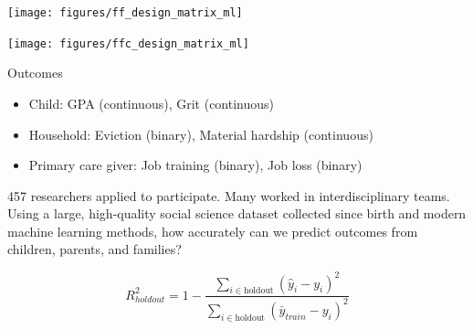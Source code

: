 \documentclass[aspectratio=169]{beamer}
\begin{document}
\begin{frame}

\begin{center}
\end{center}

\end{frame}
\begin{frame}

\begin{center}
\texttt{[image: figures/ff\_design\_matrix\_ml]}
\end{center}

\end{frame}
\begin{frame}

\begin{center}
\texttt{[image: figures/ffc\_design\_matrix\_ml]}
\end{center}

\end{frame}
\begin{frame}

Outcomes
\begin{itemize}
\item Child: GPA (continuous), Grit (continuous)
\item Household:  Eviction (binary), Material hardship (continuous)
\item Primary care giver: Job training (binary), Job loss (binary)
\end{itemize}

\end{frame}
\begin{frame}

457 researchers applied to participate. Many worked in interdisciplinary teams.
\pause
Using a large, high-quality social science dataset collected since birth and modern machine learning methods, how accurately can we predict outcomes from children, parents, and families?

\begin{equation*}
R^2_{holdout} = 1 - \frac{\sum_{i \in \text{holdout}} (\hat{y}_i - y_i)^2}{\sum_{i \in \text{holdout}} (\bar{y}_{train} - y_i)^2}
\end{equation*}

\end{frame}
\end{document}
